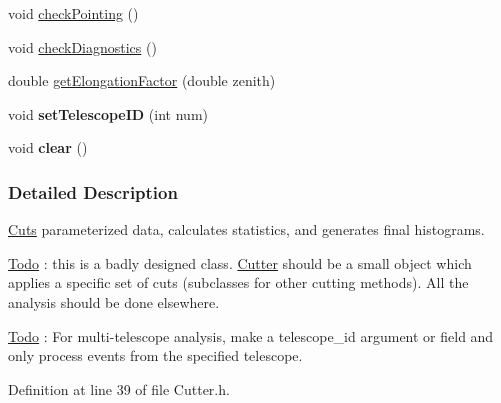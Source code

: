 \begin{DoxyCompactItemize}
\item 
\hypertarget{classCutter_a3149fbadf8d441d6506a49bc1a3f37fb}{
void \hyperlink{classCutter_a3149fbadf8d441d6506a49bc1a3f37fb}{checkPointing} ()}
\label{classCutter_a3149fbadf8d441d6506a49bc1a3f37fb}

\item 
\hypertarget{classCutter_a749513671e6f22e31587fd472844c3df}{
void \hyperlink{classCutter_a749513671e6f22e31587fd472844c3df}{checkDiagnostics} ()}
\label{classCutter_a749513671e6f22e31587fd472844c3df}

\item 
double \hyperlink{classCutter_a3c92b110a34487b1a20740eb7d395b20}{getElongationFactor} (double zenith)
\item 
\hypertarget{classCutter_adf08fb8b5af263109ca7b9e24f327bc3}{
void {\bfseries setTelescopeID} (int num)}
\label{classCutter_adf08fb8b5af263109ca7b9e24f327bc3}

\item 
\hypertarget{classCutter_a202368215c24637b30e9b38107fe3036}{
void {\bfseries clear} ()}
\label{classCutter_a202368215c24637b30e9b38107fe3036}

\end{DoxyCompactItemize}


\subsubsection{Detailed Description}
\hyperlink{namespaceCuts}{Cuts} parameterized data, calculates statistics, and generates final histograms. 

\begin{Desc}
\item[\hyperlink{todo__todo000006}{Todo}]: this is a badly designed class. \hyperlink{classCutter}{Cutter} should be a small object which applies a specific set of cuts (subclasses for other cutting methods). All the analysis should be done elsewhere.\end{Desc}


\begin{Desc}
\item[\hyperlink{todo__todo000007}{Todo}]: For multi-\/telescope analysis, make a telescope\_\-id argument or field and only process events from the specified telescope. \end{Desc}


Definition at line 39 of file Cutter.h.



